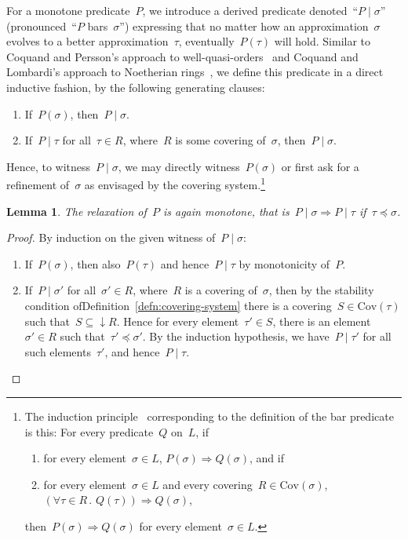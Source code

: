 \documentclass[com,11pt,crcready]{iosart2x}
\theoremstyle{definition}
\theoremstyle{plain}
\newtheorem{lemma}[definition]{Lemma}
\theoremstyle{remark}
\newcommand{\?}{\,{:}\,}
\newcommand{\Cov}{\mathrm{Cov}}
\renewcommand{\_}{\mathpunct{.}\,}
\begin{document}
For a monotone predicate~$P$, we introduce a derived predicate denoted~``$P
\mid \sigma$'' (pronounced~``$P$ bars~$\sigma$'') expressing that no matter how an approximation~$\sigma$ evolves
to a better approximation~$\tau$, eventually~$P(\tau)$ will hold. Similar to
Coquand and Persson's approach to well-quasi-orders~\cite[Definition~6]{coquand-persson:groebner} and
Coquand and Lombardi's approach to Noetherian
rings~\cite{coquand-lombardi:krull,coquand:invariant}, we define this predicate
in a direct inductive fashion, by the following generating clauses:
\begin{enumerate}
\item If~$P(\sigma)$, then~$P \mid \sigma$.
\item If~$P \mid \tau$ for all~$\tau \in R$, where~$R$ is some covering
of~$\sigma$, then~$P \mid \sigma$.
\end{enumerate}
Hence, to witness~$P \mid \sigma$, we may directly witness~$P(\sigma)$ or first
ask for a refinement of~$\sigma$ as envisaged by the covering
system.\footnote{The induction
principle~\cite{aczel-rathjen:notes,aczel-rathjen:cstdraft,rathjen:genind,aczel:ind} corresponding to the definition of the
bar predicate is this: For every predicate~$Q$ on~$L$, if
\begin{enumerate}
\item for every element~$\sigma \in L$, $P(\sigma) \Rightarrow Q(\sigma)$, and if
\item for every element~$\sigma \in L$ and every covering~$R \in \Cov(\sigma)$,
$(\forall \tau \in R\_ Q(\tau)) \Rightarrow Q(\sigma)$,
\end{enumerate}
then~$P(\sigma) \Rightarrow Q(\sigma)$ for every element~$\sigma \in L$.}

\begin{lemma}The relaxation of~$P$ is again monotone, that is~$P \mid \sigma
\Rightarrow P \mid \tau$ if~$\tau \preceq \sigma$.\end{lemma}

\begin{proof}By induction on the given witness of~$P \mid \sigma$:
\begin{enumerate}
\item If~$P(\sigma)$, then also~$P(\tau)$ and hence~$P \mid \tau$ by
monotonicity of~$P$.
\item If~$P \mid \sigma'$ for all~$\sigma' \in R$, where~$R$ is a covering
of~$\sigma$, then by the stability condition
ofDefinition~\ref{defn:covering-system} there is a covering~$S \in \Cov(\tau)$
such that~$S \subseteq {\downarrow}R$. Hence for every element~$\tau' \in S$,
there is an element~$\sigma' \in R$ such that~$\tau' \preceq \sigma'$. By the
induction hypothesis, we have~$P \mid \tau'$ for all such elements~$\tau'$, and
hence~$P \mid \tau$. \qedhere
\end{enumerate}
\end{proof}
\end{document}
